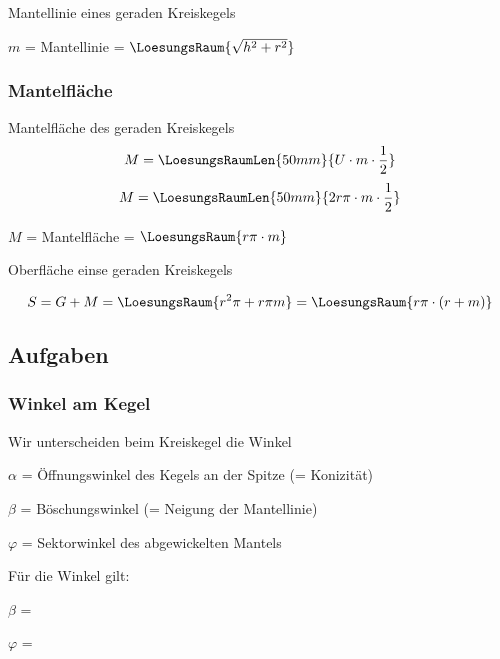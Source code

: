 \begin{gesetz}{Mantellinie eines geraden Kreiskegels}{}

  $m$ = Mantellinie = $\LoesungsRaum{\sqrt{h^2 + r^2}}$
  
\end{gesetz}



\newpage
\subsubsection{Mantelfläche}



\begin{gesetz}{Mantelfläche des geraden Kreiskegels}{}
$$M = \LoesungsRaumLen{50mm}{U\cdot{}m\cdot{}\frac12}$$
$$M = \LoesungsRaumLen{50mm}{2r\pi\cdot{} m\cdot{}\frac12}$$

$M$ = Mantelfläche = $\LoesungsRaum{r\pi\cdot{}m}$

\end{gesetz}



\begin{gesetz}{Oberfläche einse geraden Kreiskegels}{}

  $$S = G + M = \LoesungsRaum{r^2\pi + r\pi m} = \LoesungsRaum{r\pi\cdot{}(r+m)}$$
\end{gesetz}


\newpage
\subsection*{Aufgaben}
\newpage

\subsubsection{Winkel am Kegel}
\begin{bemerkung}{}{}
  Wir unterscheiden beim Kreiskegel die Winkel

  $\alpha$ = Öffnungswinkel des Kegels an der Spitze (= Konizität)

  $\beta$ = Böschungswinkel (= Neigung der Mantellinie)

  $\varphi$ = Sektorwinkel des abgewickelten Mantels
\end{bemerkung}

\begin{gesetz}{}{}
  Für die Winkel gilt:

  $\beta$ = 

  $\varphi$ = \LoesungsRaumLang{$360\degre \cdot \sin\left(\frac{\alpha}2\right)$}
\end{gesetz}



